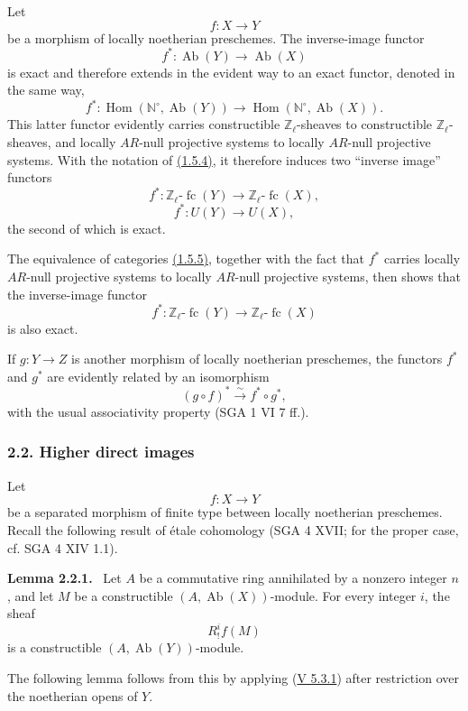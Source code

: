 \documentclass[11pt]{article}
\newenvironment{statement}[1]{\par\medskip\noindent\textbf{#1.}\ }{\par\medskip}
\DeclareMathOperator{\Hom}{Hom}
\providecommand{\Hom}{\operatorname{Hom}}
\providecommand{\Ab}{\operatorname{Ab}}
\providecommand{\fc}{\operatorname{fc}}
\providecommand{\Ab}{\operatorname{Ab}}
\providecommand{\Hom}{\operatorname{Hom}}
\begin{document}
Let
\[
f:X\longrightarrow Y
\]
be a morphism of locally noetherian preschemes. The inverse-image functor
\[
f^*:\Ab(Y)\longrightarrow \Ab(X)
\]
is exact and therefore extends in the evident way to an exact functor, denoted in the same way,
\[
f^*:\Hom(\mathbb N^\circ,\Ab(Y))\longrightarrow \Hom(\mathbb N^\circ,\Ab(X)).
\]
This latter functor evidently carries constructible \(\mathbb Z_\ell\)-sheaves to constructible \(\mathbb Z_\ell\)-sheaves, and locally \(AR\)-null projective systems to locally \(AR\)-null projective systems. With the notation of \hyperref[sga5:VI:notation:1.5.4]{(1.5.4)}, it therefore induces two ``inverse image'' functors
\[
f^*:\mathbb Z_\ell\text{-}\fc(Y)\longrightarrow \mathbb Z_\ell\text{-}\fc(X),
\]
\[
f^*:U(Y)\longrightarrow U(X),
\]
the second of which is exact.

The equivalence of categories \hyperref[sga5:VI:proposition:1.5.5]{(1.5.5)}, together with the fact that \(f^*\) carries locally \(AR\)-null projective systems to locally \(AR\)-null projective systems, then shows that the inverse-image functor
\[
f^*:\mathbb Z_\ell\text{-}\fc(Y)\longrightarrow \mathbb Z_\ell\text{-}\fc(X)
\]
is also exact.

If \(g:Y\to Z\) is another morphism of locally noetherian preschemes, the functors \(f^*\) and \(g^*\) are evidently related by an isomorphism
\[
(g\circ f)^*\xrightarrow{\sim}f^*\circ g^*,
\]
with the usual associativity property (SGA 1 VI 7 ff.).

\subsubsection*{2.2. Higher direct images}\label{sga5:VI:subsubsection:2.2}

Let
\[
f:X\longrightarrow Y
\]
be a separated morphism of finite type between locally noetherian preschemes. Recall the following result of étale cohomology (SGA 4 XVII; for the proper case, cf. SGA 4 XIV 1.1).

\label{sga5:VI:lemma:2.2.1}\begin{statement}{Lemma 2.2.1}
Let \(A\) be a commutative ring annihilated by a nonzero integer \(n\), and let \(M\) be a constructible \((A,\Ab(X))\)-module. For every integer \(i\), the sheaf
\[
R^i_!f(M)
\]
is a constructible \((A,\Ab(Y))\)-module.
\end{statement}

The following lemma follows from this by applying (\hyperref[sga5:V:proposition:5.3.1]{V 5.3.1}) after restriction over the noetherian opens of \(Y\).
\end{document}
